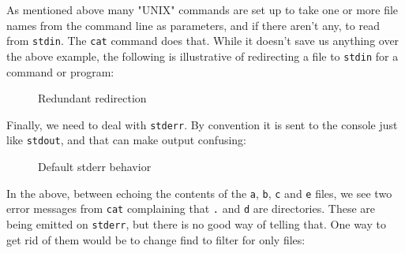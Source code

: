 \documentclass[10pt,american,]{book}
\newenvironment{Shaded}{\begin{snugshade}}{\end{snugshade}}
\newcommand{\KeywordTok}[1]{\textcolor[rgb]{0.13,0.29,0.53}{\textbf{{#1}}}}
\newcommand{\DataTypeTok}[1]{\textcolor[rgb]{0.13,0.29,0.53}{{#1}}}
\newcommand{\NormalTok}[1]{{#1}}
\numberwithin{figure}{chapter}
\DeclareRobustCommand{\drcap}[1]{\begin{figure}[H]\caption{#1}\end{figure}}
\renewcommand{\KeywordTok}[1]{{#1}}
\renewcommand{\DataTypeTok}[1]{{#1}}
\renewcommand{\NormalTok}[1]{{#1}}
\begin{document}
As mentioned above many "UNIX" commands are set up to take one or more
file names from the command line as parameters, and if there aren't any,
to read from \texttt{stdin}. The \texttt{cat} command does that. While
it doesn't save us anything over the above example, the following is
illustrative of redirecting a file to \texttt{stdin} for a command or
program:

\drcap{Redundant redirection}

\begin{Shaded}
\end{Shaded}

Finally, we need to deal with \texttt{stderr}. By convention it is sent
to the console just like \texttt{stdout}, and that can make output
confusing:

\drcap{Default stderr behavior}

\begin{Shaded}
\end{Shaded}

In the above, between echoing the contents of the \texttt{a},
\texttt{b}, \texttt{c} and \texttt{e} files, we see two error messages
from \texttt{cat} complaining that \texttt{.} and \texttt{d} are
directories. These are being emitted on \texttt{stderr}, but there is no
good way of telling that. One way to get rid of them would be to change
find to filter for only files:
\end{document}
